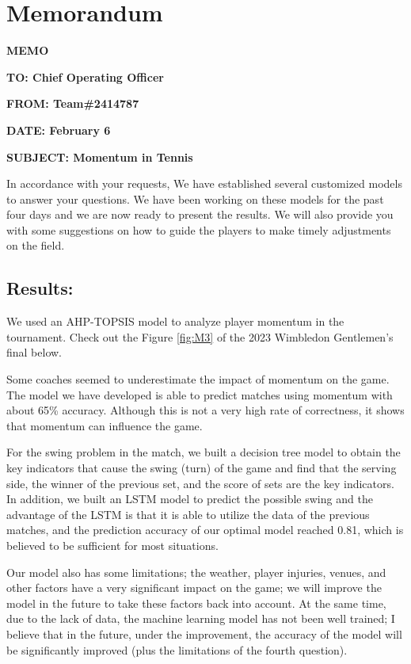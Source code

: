 \newpage
\section*{Memorandum}
{\large
    \textbf{MEMO} \par
    \textbf{TO: Chief Operating Officer} \par
    \textbf{FROM: Team\#2414787} \par
    \textbf{DATE: February 6} \par
    \textbf{SUBJECT: Momentum in Tennis} \par
}

\par
\partLine

In accordance with your requests, We have established several customized models to answer your questions. We have been working on these models for the past four days and we are now ready to present the results. We will also provide you with some suggestions on how to guide the players to make timely adjustments on the field.

\subsection*{Results: }
We used an AHP-TOPSIS model to analyze player momentum in the tournament. Check out the Figure \ref{fig:M3} of the 2023 Wimbledon Gentlemen's final below.\par

Some coaches seemed to underestimate the impact of momentum on the game. The model we have developed is able to predict matches using momentum with about 65\% accuracy. Although this is not a very high rate of correctness, it shows that momentum can influence the game.\par

For the swing problem in the match, we built a decision tree model to obtain the key indicators that cause the swing (turn) of the game and find that the serving side, the winner of the previous set, and the score of sets are the key indicators. In addition, we built an LSTM model to predict the possible swing and the advantage of the LSTM is that it is able to utilize the data of the previous matches, and the prediction accuracy of our optimal model reached 0.81, which is believed to be sufficient for most situations. \par

Our model also has some limitations; the weather, player injuries, venues, and other factors have a very significant impact on the game; we will improve the model in the future to take these factors back into account. At the same time, due to the lack of data, the machine learning model has not been well trained; I believe that in the future, under the improvement, the accuracy of the model will be significantly improved (plus the limitations of the fourth question). \par

